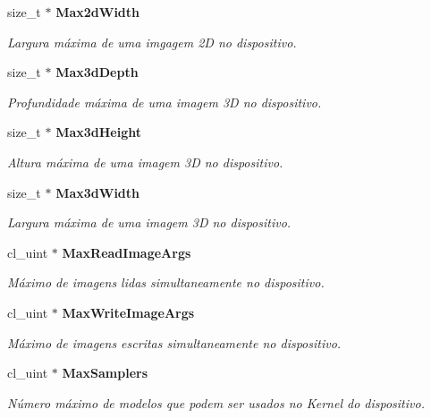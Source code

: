 \begin{DoxyCompactItemize}
\mbox{\label{structdevices_a18f56dc01b4463c4ded05b3d35c829d8}} 
size\+\_\+t $\ast$ \textbf{ Max2d\+Width}
\begin{DoxyCompactList}\small\item\em Largura máxima de uma imgagem 2D no dispositivo. \end{DoxyCompactList}\item 
\mbox{\label{structdevices_acaf6beb0a2264711c7819587a4459ac2}} 
size\+\_\+t $\ast$ \textbf{ Max3d\+Depth}
\begin{DoxyCompactList}\small\item\em Profundidade máxima de uma imagem 3D no dispositivo. \end{DoxyCompactList}\item 
\mbox{\label{structdevices_a556a1e11d72df9890409b935d0582f89}} 
size\+\_\+t $\ast$ \textbf{ Max3d\+Height}
\begin{DoxyCompactList}\small\item\em Altura máxima de uma imagem 3D no dispositivo. \end{DoxyCompactList}\item 
\mbox{\label{structdevices_ab44a9760cf2dc77618720a2a5828e8e9}} 
size\+\_\+t $\ast$ \textbf{ Max3d\+Width}
\begin{DoxyCompactList}\small\item\em Largura máxima de uma imagem 3D no dispositivo. \end{DoxyCompactList}\item 
\mbox{\label{structdevices_af060538b760d37d69f1e5995af4928d9}} 
cl\+\_\+uint $\ast$ \textbf{ Max\+Read\+Image\+Args}
\begin{DoxyCompactList}\small\item\em Máximo de imagens lidas simultaneamente no dispositivo. \end{DoxyCompactList}\item 
\mbox{\label{structdevices_accf0de8457f8fdb7b72b6e2103c79cd4}} 
cl\+\_\+uint $\ast$ \textbf{ Max\+Write\+Image\+Args}
\begin{DoxyCompactList}\small\item\em Máximo de imagens escritas simultaneamente no dispositivo. \end{DoxyCompactList}\item 
\mbox{\label{structdevices_a9a25cdc63c37597479a8863ffc94440c}} 
cl\+\_\+uint $\ast$ \textbf{ Max\+Samplers}
\begin{DoxyCompactList}\small\item\em Número máximo de modelos que podem ser usados no Kernel do dispositivo. \end{DoxyCompactList}\item 

\end{DoxyCompactItemize}
